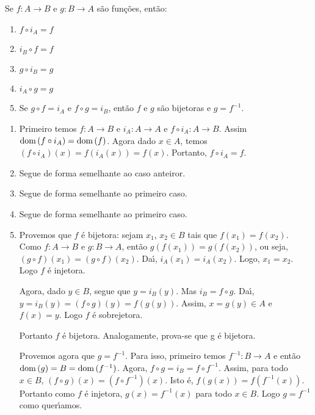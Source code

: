 \begin{proposicao}\label{propriedades_identidade}
	Se $f : A \to B$ e $g : B \to A$ s{\~a}o fun{\c c}{\~o}es, ent{\~a}o:
	\begin{enumerate}[label={\roman*})]
		\item $f\circ i_{A} = f$
		\item $i_{B}\circ f = f$
		\item $g\circ i_{B} = g$
		\item $i_{A}\circ g = g$
		\item Se $g\circ f = i_{A}$ e $f\circ g = i_{B}$, ent{\~a}o $f$ e $g$ s{\~a}o bijetoras e $g=f^{-1}$.
	\end{enumerate}
\end{proposicao}
\begin{prova}
	\begin{enumerate}[label={\roman*})]
		\item Primeiro temos $f: A \to B$ e $i_{A} : A \to A$ e $f\circ i_{A} : A \to B$. Assim ${\rm dom\,}(f\circ i_{A}) = {\rm dom\,}(f)$. Agora dado $x \in A$, temos $(f\circ i_{A})(x) = f(i_{A}(x)) = f(x)$. Portanto, $f\circ i_{A} = f$.
		\item Segue de forma semelhante ao caso anteiror.
		\item Segue de forma semelhante ao primeiro caso.
		\item Segue de forma semelhante ao primeiro caso.
		\item Provemos que $f$ \'e bijetora: sejam $x_1$, $x_2 \in B$ tais que $f(x_1) = f(x_2)$. Como $f : A \to B$ e $g : B \to A$, ent{\~a}o $g(f(x_1)) = g(f(x_2))$, ou seja, $(g\circ f)(x_1) = (g\circ f)(x_2)$. Da{\'\i}, $i_{A}(x_1) = i_{A}(x_2)$. Logo, $x_1 = x_2$. Logo $f$ {\'e} injetora.

		Agora, dado $y \in B$, segue que $y = i_{B}(y)$. Mas $i_{B} = f\circ g$. Da{\'\i}, $y = i_{B}(y) = (f\circ g)(y) = f(g(y))$. Assim, $x = g(y)\in A$ e $f(x) = y$. Logo $f$ {\'e} sobrejetora.

		Portanto $f$ {\'e} bijetora. Analogamente, prova-se que g {\'e} bijetora. 

		Provemos agora que $g = f^{-1}$. Para isso, primeiro temos  $f^{-1} : B \to A$ e ent\~ao ${\rm dom\,}(g) = B = {\rm dom\,}(f^{-1})$. Agora, $f\circ g = i_{B} = f\circ f^{-1}$. Assim, para todo $x \in B$, $(f\circ g)(x) = (f\circ f^{-1})(x)$. Isto {\'e}, $f(g(x)) = f(f^{-1}(x))$. Portanto como $f$ \'e injetora, $g(x) = f^{-1}(x)$ para todo $x\in B$. Logo $g = f^{-1}$ como quer{\'\i}amos.
	\end{enumerate}
\end{prova}